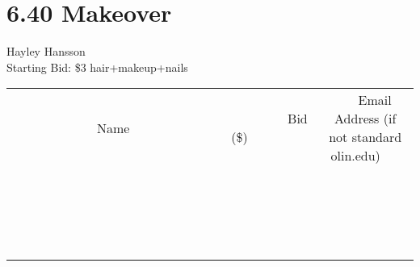 \documentclass[11pt]{article}
\begin{document}
\section*{6.40 Makeover}
Hayley Hansson
\\
Starting Bid: \$3
\newline
hair+makeup+nails
\\[3ex]
\begin{tabular}{c c c}
~~~~~~~~~~~~~Name~~~~~~~~~~~~~ & ~~~~~~~~~Bid (\$)~~~~~~~~~  & ~~~Email Address (if not standard olin.edu)~~~\\
 & & \\
\hline
 & & \\
\hline
 & & \\
\hline
 & & \\
\hline
 & & \\
\hline
 & & \\
\hline
 & & \\
\hline
 & & \\
\hline
 & & \\
\hline
 & & \\
\hline
 & & \\
\hline
 & & \\
\hline
 & & \\
\hline
 & & \\
\hline
 & & \\
\hline
 & & \\
\hline
 & & \\
\hline
 & & \\
\hline
 & & \\
\hline
\end{tabular}
\newpage
\end{document}
